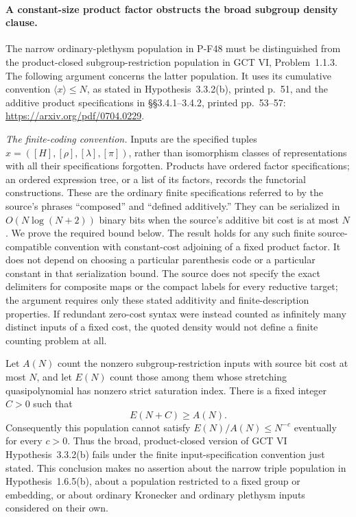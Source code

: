 \paragraph{A constant-size product factor obstructs the broad subgroup density clause.}
The narrow ordinary-plethysm population in P-F48 must be distinguished
from the product-closed subgroup-restriction population in GCT VI,
Problem~1.1.3.  The following argument concerns the latter population.
It uses its cumulative convention $\langle x\rangle\le N$, as stated
in Hypothesis~3.3.2(b), printed p.~51, and the additive product
specifications in \S\S3.4.1--3.4.2, printed pp.~53--57:
\url{https://arxiv.org/pdf/0704.0229}.

\emph{The finite-coding convention.}
Inputs are the specified tuples
$x=([H],[\rho],[\lambda],[\pi])$, rather than isomorphism classes
of representations with all their specifications forgotten.
Products have ordered factor specifications; an ordered expression
tree, or a list of its factors, records the functorial constructions.
These are the ordinary finite specifications referred to by the
source's phrases ``composed'' and ``defined additively.''  They
can be serialized in $O(N\log(N+2))$ binary bits when the source's
additive bit cost is at most $N$.  We prove the required bound below.
The result holds for any such finite source-compatible convention
with constant-cost adjoining of a fixed product factor.  It does
not depend on choosing a particular parenthesis code or a particular
constant in that serialization bound.  The source does not specify
the exact delimiters for composite maps or the compact labels for
every reductive target; the argument requires only these stated
additivity and finite-description properties.  If redundant
zero-cost syntax were instead counted as infinitely many distinct
inputs of a fixed cost, the quoted density would not define a
finite counting problem at all.

Let $A(N)$ count the nonzero subgroup-restriction inputs with source
bit cost at most $N$, and let $E(N)$ count those among them whose
stretching quasipolynomial has nonzero strict saturation index.
There is a fixed integer $C>0$ such that
\[
                    E(N+C)\ge A(N).                 \tag{P-F63a}
\]
Consequently this population cannot satisfy
$E(N)/A(N)\le N^{-c}$ eventually for every $c>0$.
Thus the broad, product-closed version of GCT VI
Hypothesis~3.3.2(b) fails under the finite input-specification
convention just stated.  This conclusion makes no assertion about
the narrow triple population in Hypothesis~1.6.5(b), about a
population restricted to a fixed group or embedding, or about
ordinary Kronecker and ordinary plethysm inputs considered on
their own.

